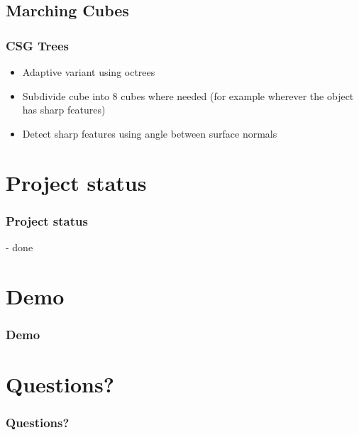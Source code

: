 \documentclass[t]{beamer}
\begin{document}
\subsection{Marching Cubes}
\begin{frame}
\frametitle{CSG Trees}
\begin{itemize}
 \item Adaptive variant using octrees
 \item Subdivide cube into 8 cubes where needed (for example wherever
  the object has sharp features)
 \item Detect sharp features using angle between surface normals
\end{itemize}
\end{frame}

\section{Project status}
\begin{frame}
\frametitle{Project status}
- done
\end{frame}

\section{Demo}
\begin{frame}
\frametitle{Demo}
\end{frame}

\section{Questions?}
\begin{frame}
\frametitle{Questions?}
\end{frame}
\end{document}
